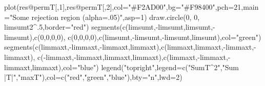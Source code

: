 \documentclass[
]{article}
\newenvironment{Shaded}{\begin{snugshade}}{\end{snugshade}}
\newcommand{\AttributeTok}[1]{\textcolor[rgb]{0.77,0.63,0.00}{#1}}
\newcommand{\DecValTok}[1]{\textcolor[rgb]{0.00,0.00,0.81}{#1}}
\newcommand{\FunctionTok}[1]{\textcolor[rgb]{0.00,0.00,0.00}{#1}}
\newcommand{\NormalTok}[1]{#1}
\newcommand{\SpecialCharTok}[1]{\textcolor[rgb]{0.00,0.00,0.00}{#1}}
\newcommand{\StringTok}[1]{\textcolor[rgb]{0.31,0.60,0.02}{#1}}
\begin{document}
\begin{Shaded}
\begin{Highlighting}[]
\FunctionTok{plot}\NormalTok{(res}\SpecialCharTok{@}\NormalTok{permT[,}\DecValTok{1}\NormalTok{],res}\SpecialCharTok{@}\NormalTok{permT[,}\DecValTok{2}\NormalTok{],}\AttributeTok{col=}\StringTok{"\#F2AD00"}\NormalTok{,}\AttributeTok{bg=}\StringTok{"\#F98400"}\NormalTok{,}\AttributeTok{pch=}\DecValTok{21}\NormalTok{,}\AttributeTok{main=}\StringTok{"Some rejection region (alpha=.05)"}\NormalTok{,}\AttributeTok{asp=}\DecValTok{1}\NormalTok{)}
\FunctionTok{draw.circle}\NormalTok{(}\DecValTok{0}\NormalTok{, }\DecValTok{0}\NormalTok{, limsumt2}\SpecialCharTok{\^{}}\NormalTok{.}\DecValTok{5}\NormalTok{,}\AttributeTok{border=}\StringTok{"red"}\NormalTok{)}
\FunctionTok{segments}\NormalTok{(}\FunctionTok{c}\NormalTok{(limsumt,}\SpecialCharTok{{-}}\NormalTok{limsumt,limsumt,}\SpecialCharTok{{-}}\NormalTok{limsumt),}\FunctionTok{c}\NormalTok{(}\DecValTok{0}\NormalTok{,}\DecValTok{0}\NormalTok{,}\DecValTok{0}\NormalTok{,}\DecValTok{0}\NormalTok{),}
         \FunctionTok{c}\NormalTok{(}\DecValTok{0}\NormalTok{,}\DecValTok{0}\NormalTok{,}\DecValTok{0}\NormalTok{,}\DecValTok{0}\NormalTok{),}\FunctionTok{c}\NormalTok{(limsumt,}\SpecialCharTok{{-}}\NormalTok{limsumt,}\SpecialCharTok{{-}}\NormalTok{limsumt,limsumt),}\AttributeTok{col=}\StringTok{"green"}\NormalTok{)}
\FunctionTok{segments}\NormalTok{(}\FunctionTok{c}\NormalTok{(limmaxt,}\SpecialCharTok{{-}}\NormalTok{limmaxt,}\SpecialCharTok{{-}}\NormalTok{limmaxt,limmaxt),}\FunctionTok{c}\NormalTok{(limmaxt,limmaxt,}\SpecialCharTok{{-}}\NormalTok{limmaxt,}\SpecialCharTok{{-}}\NormalTok{limmaxt),}
         \FunctionTok{c}\NormalTok{(}\SpecialCharTok{{-}}\NormalTok{limmaxt,}\SpecialCharTok{{-}}\NormalTok{limmaxt,limmaxt,limmaxt),}\FunctionTok{c}\NormalTok{(limmaxt,}\SpecialCharTok{{-}}\NormalTok{limmaxt,}\SpecialCharTok{{-}}\NormalTok{limmaxt,limmaxt),}\AttributeTok{col=}\StringTok{"blue"}\NormalTok{)}
\FunctionTok{legend}\NormalTok{(}\StringTok{"topright"}\NormalTok{,}\AttributeTok{legend=}\FunctionTok{c}\NormalTok{(}\StringTok{"SumT\^{}2"}\NormalTok{,}\StringTok{"Sum |T|"}\NormalTok{,}\StringTok{"maxT"}\NormalTok{),}\AttributeTok{col=}\FunctionTok{c}\NormalTok{(}\StringTok{"red"}\NormalTok{,}\StringTok{"green"}\NormalTok{,}\StringTok{"blue"}\NormalTok{),}\AttributeTok{bty=}\StringTok{"n"}\NormalTok{,}\AttributeTok{lwd=}\DecValTok{2}\NormalTok{)}
\end{Highlighting}
\end{Shaded}
\end{document}
